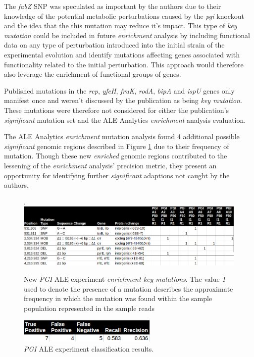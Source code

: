 \documentclass[12pt,final,masters,chapterheads]{ucsd}  %
\begin{document}
The \textit{fabZ} SNP was speculated as important by the authors due to their knowledge of the potential metabolic perturbations caused by the \textit{pgi} knockout and the idea that the this mutation may reduce it's impact. This type of \textit{key mutation} could be included in future \textit{enrichment} analysis by including functional data on any type of perturbation introduced into the initial strain of the experimental evolution and identify mutations affecting genes associated with functionality related to the initial perturbation. This approach would therefore also leverage the enrichment of functional groups of genes.

Published mutations in the \textit{rep}, \textit{yfeH}, \textit{fruK}, \textit{rodA}, \textit{bipA} and \textit{ispU} genes only manifest once and weren't discussed by the publication as being \textit{key mutation}. These mutations were therefore not considered for either the publication's \textit{significant} mutation set and the ALE Analytics \textit{enrichment} analysis evaluation.

The ALE Analytics \textit{enrichment} mutation analysis found 4 additional possible \textit{significant} genomic regions described in Figure \ref{fig:pgi_new_enrichment_muts} due to their frequency of mutation. Though these new \textit{enriched} genomic regions contributed to the lessening of the \textit{enrichment} analysis' precision metric, they present an opportunity for identifying further \textit{significant} adaptions not caught by the authors.
\begin{figure}[H]
  \caption{New \textit{PGI} ALE experiment \textit{enrichment key mutations}. The value \textit{1} used to denote the presence of a mutation describes the approximate frequency in which the mutation was found within the sample population represented in the sample reads \cite{breseq_paper}}.
  \centering
  \includegraphics[width=\textwidth]{pgi_new_enrichment_muts.png}
  \label{fig:pgi_new_enrichment_muts}
\end{figure}
\begin{figure}[H]
  \centering
  \caption{\textit{PGI} ALE experiment classification results.}
  \includegraphics[width=0.6\textwidth]{pgi_precision_recall.png}
\end{figure}
\end{document}
